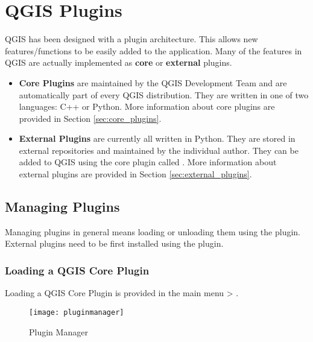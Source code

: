 
\section{QGIS Plugins}\label{sec:plugins}


QGIS has been designed with a plugin architecture.
This allows new features/functions to be easily added to the application.
Many of the features in QGIS are actually implemented as \textbf{core} or \textbf{external} plugins. 

\begin{itemize}
\item \textbf{Core Plugins} are maintained by the QGIS Development Team and are automatically part of every QGIS distribution.
They are written in one of two languages: C++ or Python.
More information about core plugins are provided in Section \ref{sec:core_plugins}.
\item \textbf{External Plugins} are currently all written in Python.
They are stored in external repositories and maintained by the individual author.
They can be added to QGIS using the core plugin called .
More information about external plugins are provided in Section \ref{sec:external_plugins}.
\end{itemize}

\subsection{Managing Plugins}\label{sec:managing_plugins}

Managing plugins in general means loading or unloading them using the  plugin.
External plugins need to be first installed using the  plugin.

\subsubsection{Loading a QGIS Core Plugin}\label{sec:load_core_plugin} 

Loading a QGIS Core Plugin is provided in the main menu  > .

\begin{figure}[ht]
   \begin{center}
   \caption{Plugin Manager \nixcaption}\label{fig:pluginmanager}\smallskip
   \texttt{[image: pluginmanager]}
\end{center}
\end{figure}

